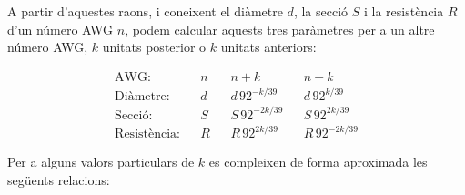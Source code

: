 A partir d'aquestes raons, i coneixent el diàmetre $d$, la secció $S$ i la resistència $R$ d'un número AWG $n$, podem calcular aquests tres paràmetres per a un altre número AWG, $k$ unitats posterior o $k$ unitats anteriors:

\begin{equation}
   \begin{array}{rllllll}
     \text{AWG:}         & & n & & n+k                & & n-k \\
     \text{Diàmetre:}    & & d & & d\, 92^{-k/39}  & & d\, 92^{k/39} \\
     \text{Secció:}      & & S & & S\, 92^{-2k/39} & & S\, 92^{2k/39} \\
     \text{Resistència:} & & R & & R\, 92^{2k/39}  & & R\, 92^{-2k/39}
   \end{array}
\end{equation}

Per a alguns valors particulars de $k$ es compleixen de forma aproximada les següents relacions:

